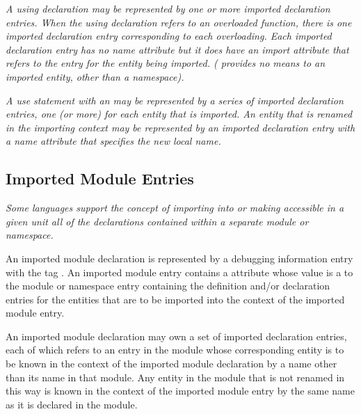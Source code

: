 \textit{A  using declaration may be represented by one or more
\hypertarget{chap:DWATimportnamespaceusingdeclaration}{}
imported 
declaration entries.  When the using declaration
refers to an overloaded function, there is one imported
declaration entry corresponding to each overloading. Each
imported declaration entry has no name attribute but it does
have an import attribute that refers to the entry for the
entity being imported. ( 
provides no means to 
an imported entity, other than a namespace).
}

\textit{A  use statement 
with an  may be
represented by a series of imported declaration entries,
one (or more) for each entity that is imported. An entity
that is renamed in the importing context may be represented
by an imported declaration entry with a name attribute that
specifies the new local name.
}

\subsection{Imported Module Entries}
\label{chap:importedmoduleentries}

\textit{Some languages support the concept of importing into or making
accessible in a given unit all of the declarations contained
within a separate module or namespace.
}

An imported module declaration is represented by a debugging
information entry with 
the 
tag \DWTAGimportedmoduleTARG.
An
imported module entry contains a 
\DWATimport{} attribute
whose value is a  
to the module or namespace entry
containing the definition and/or declaration entries for
the entities that are to be imported into the context of the
imported module entry.

An imported module declaration may own a set of imported
declaration entries, each of which refers to an entry in the
module whose corresponding entity is to be known in the context
of the imported module declaration by a name other than its
name in that module. Any entity in the module that is not
renamed in this way is known in the context of the imported
module entry by the same name as it is declared in the module.


